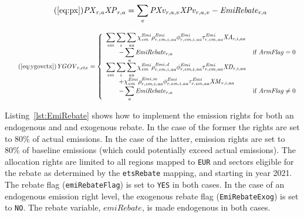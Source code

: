 \documentclass[11pt,letterpaper]{report}
\begin{document}
\begin{equation}
\label{eq:pxwrebate}
\tag{\ref{eq:px}}
\mathit{PX}_{r,a} \mathit{XP}_{r,a} =
   \sum_v {
      \mathit{PXv}_{r,a,v} \mathit{XPv}_{r,a,v}
   }
   - \mathit{EmiRebate}_{r,a}
\end{equation}

\begin{equation}
\label{eq:ygovctxp}
\tag{\ref{eq:ygovctx}}
\mathit{YGOV}_{r,ctx} =
\left\{
   \begin{array}{*{20}{l}}
      \displaystyle \sum_{\mathit{em}} { \sum_{i} {\sum_{\mathit{aa}} {
         \chi^{\mathit{Emi}}_{\mathit{em}}
         \rho^{\mathit{Emi}}_{r,\mathit{em},i,\mathit{aa}}
         \phi^{\mathit{Emi}}_{r,\mathit{em},i,\mathit{aa}}
            \tau^{\mathit{Emi}}_{r,\mathit{em},\mathit{aa}} \mathit{XA}_{r,i,aa}
      }}} \\
      \qquad \displaystyle
      - \sum_a{\mathit{EmiRebate}_{r,a}}

      & \textrm{if } \mathit{ArmFlag} = 0 \\
      \displaystyle \sum_{\mathit{em}} { \sum_{i} {\sum_{\mathit{aa}} {
         \chi^{\mathit{Emi}}_{\mathit{em}}
         \rho^{\mathit{Emi,d}}_{r,\mathit{em},i,\mathit{aa}}
         \phi^{\mathit{Emi}}_{r,\mathit{em},i,\mathit{aa}}
         \tau^{\mathit{Emi}}_{r,\mathit{em},\mathit{aa}}
            \mathit{XD}_{r,i,aa} }}} \\
      \qquad \displaystyle
      +  {\chi^{\mathit{Emi}}_{\mathit{em}}
            \rho^{\mathit{Emi,m}}_{r,\mathit{em},i,\mathit{aa}}
            \phi^{\mathit{Emi}}_{r,\mathit{em},i,\mathit{aa}}
            \tau^{\mathit{Emi}}_{r,\mathit{em},\mathit{aa}}\mathit{XM}_{r,i,aa}
         } \\
      \qquad \displaystyle
      - \sum_a{\mathit{EmiRebate}_{r,a}}
      & \textrm{if } \mathit{ArmFlag} \ne 0 \\
\end{array}
\right.
\end{equation}

Listing~\ref{lst:EmiRebate} shows how to implement
the emission rights for both an endogenous and
and exogenous rebate. In the case of the former
the rights are set to 80\% of actual emissions.
In the case of the latter, emission rights are
set to 80\% of baseline emissions (which could
potentially exceed actual emissions).
The allocation rights are limited to all
regions mapped to \texttt{EUR} and sectors
eligible for the rebate as determined by the \texttt{etsRebate}
mapping, and starting in year 2021.
The rebate flag (\texttt{emiRebateFlag}) is set to
\texttt{YES} in both cases.
In the case of an endogenous emission right level,
the exogenous rebate flag (\texttt{EmiRebateExog}) is set to \texttt{NO}.
The rebate variable, $emiRebate$, is made endogenous in both cases.
\end{document}
